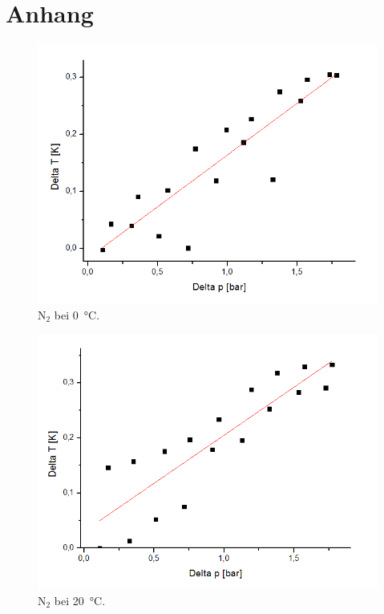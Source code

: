 \documentclass[a4paper,12pt,oneside,onecolum,final,openany]{report}
\begin{document}
\chapter{Anhang}
\begin{center}
\begin{figure}[h]
\includegraphics[width=13.5cm]{N2bei0.png}
\caption{$\text{N}_2$ bei 0~°C.}
\end{figure}
\end{center}
\begin{center}
\begin{figure}[h]
\includegraphics[width=13.5cm]{N2bei22,7.png}
\caption{$\text{N}_2$ bei 20~°C.}
\end{figure}
\end{center}
\end{document}
